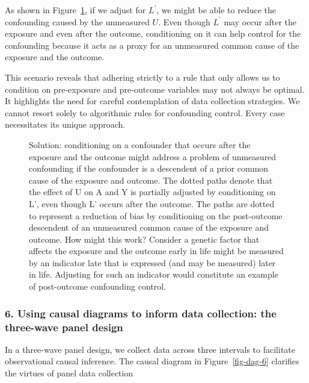 \documentclass[
  singlecolumn]{article}
\begin{document}
As shown in Figure~\ref{fig-dag-descendent-solution-2}, if we adjust for
\(L^\prime\), we might be able to reduce the confounding caused by the
unmeasured \(U\). Even though \(L^\prime\) may occur after the exposure
and even after the outcome, conditioning on it can help control for the
confounding because it acts as a proxy for an unmeasured common cause of
the exposure and the outcome.

This scenario reveals that adhering strictly to a rule that only allows
us to condition on pre-exposure and pre-outcome variables may not always
be optimal. It highlights the need for careful contemplation of data
collection strategies. We cannot resort solely to algorithmic rules for
confounding control. Every case necessitates its unique approach.

\begin{figure}[htb]


\caption{\label{fig-dag-descendent-solution-2}Solution: conditioning on
a confounder that occurs after the exposure and the outcome might
address a problem of unmeasured confounding if the confounder is a
descendent of a prior common cause of the exposure and outcome. The
dotted paths denote that the effect of U on A and Y is partially
adjusted by conditioning on L', even though L' occurs after the outcome.
The paths are dotted to represent a reduction of bias by conditioning on
the post-outcome descendent of an unmeasured common cause of the
exposure and outcome. How might this work? Consider a genetic factor
that affects the exposure and the outcome early in life might be
measured by an indicator late that is expressed (and may be measured)
later in life. Adjusting for such an indicator would constitute an
example of post-outcome confounding control.}

\end{figure}%

\subsubsection{6. Using causal diagrams to inform data collection: the
three-wave panel
design}\label{using-causal-diagrams-to-inform-data-collection-the-three-wave-panel-design}

In a three-wave panel design, we collect data across three intervals to
facilitate observational causal inference. The causal diagram in
Figure~\ref{fig-dag-6} clarifies the virtues of panel data collection
\end{document}
